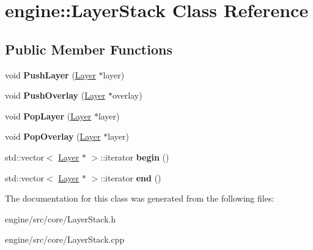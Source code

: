 \hypertarget{classengine_1_1LayerStack}{}\section{engine\+:\+:Layer\+Stack Class Reference}
\label{classengine_1_1LayerStack}
\subsection*{Public Member Functions}
\begin{DoxyCompactItemize}
\item 
\mbox{\label{classengine_1_1LayerStack_a3e18dd7877bf00498b9771cf91fc9b7c}} 
void {\bfseries Push\+Layer} (\hyperlink{classengine_1_1Layer}{Layer} $\ast$layer)
\item 
\mbox{\label{classengine_1_1LayerStack_a4b84a2581e5647cd73b5924c7982680f}} 
void {\bfseries Push\+Overlay} (\hyperlink{classengine_1_1Layer}{Layer} $\ast$overlay)
\item 
\mbox{\label{classengine_1_1LayerStack_a864050f5ad6ed9ffe04974c9411fad94}} 
void {\bfseries Pop\+Layer} (\hyperlink{classengine_1_1Layer}{Layer} $\ast$layer)
\item 
\mbox{\label{classengine_1_1LayerStack_aecbddf93a6f5846a902570a980a63ddb}} 
void {\bfseries Pop\+Overlay} (\hyperlink{classengine_1_1Layer}{Layer} $\ast$layer)
\item 
\mbox{\label{classengine_1_1LayerStack_a341bf522aa1af78ba06e3fdf510df271}} 
std\+::vector$<$ \hyperlink{classengine_1_1Layer}{Layer} $\ast$ $>$\+::iterator {\bfseries begin} ()
\item 
\mbox{\label{classengine_1_1LayerStack_ad05cf0f1deec9dd7f7d8ead15febf657}} 
std\+::vector$<$ \hyperlink{classengine_1_1Layer}{Layer} $\ast$ $>$\+::iterator {\bfseries end} ()
\end{DoxyCompactItemize}


The documentation for this class was generated from the following files\+:\begin{DoxyCompactItemize}
\item 
engine/src/core/Layer\+Stack.\+h\item 
engine/src/core/Layer\+Stack.\+cpp\end{DoxyCompactItemize}
